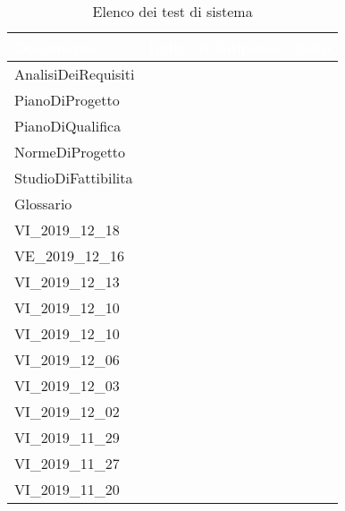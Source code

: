 {
\renewcommand{\arraystretch}{1.5}
\centering
\begin{longtable}{ C{4cm} | C{4cm} | C{4cm} }
\caption{Elenco dei test di sistema}\\
\textcolor{white}{\textbf{Documento}} & \textcolor{white}{\textbf{Indici di Gulpease}} & \textcolor{white}{\textbf{Esito}} \\
\hline
\endhead
AnalisiDeiRequisiti &  & \\
PianoDiProgetto &  & \\
PianoDiQualifica &  & \\

NormeDiProgetto &  & \\
StudioDiFattibilita &  & \\

Glossario &  & \\

VI\_2019\_12\_18 & & \\
VE\_2019\_12\_16 & & \\
VI\_2019\_12\_13 & & \\
VI\_2019\_12\_10 & & \\
VI\_2019\_12\_10 & & \\
VI\_2019\_12\_06 & & \\
VI\_2019\_12\_03 & & \\
VI\_2019\_12\_02 & & \\
VI\_2019\_11\_29 & & \\
VI\_2019\_11\_27 & & \\
VI\_2019\_11\_20 & & \\

\end{longtable}
}
